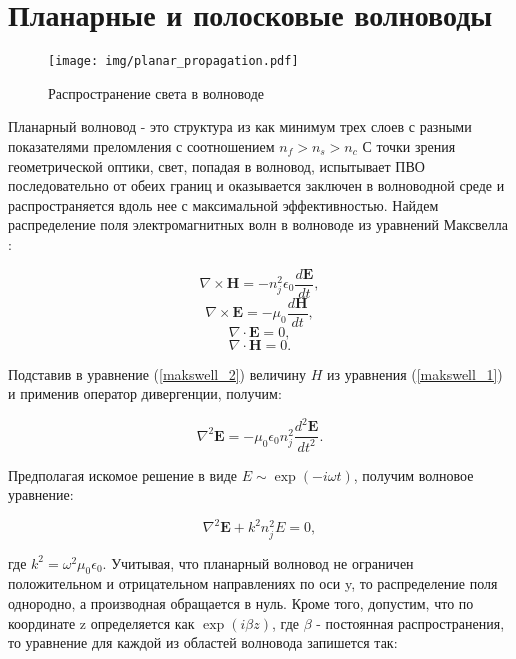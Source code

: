 \section{Планарные и полосковые волноводы}

\begin{figure}[h!]
\texttt{[image: img/planar\_propagation.pdf]}
\caption{Распространение света в волноводе}
\end{figure}

Планарный волновод - это структура из как минимум трех слоев с разными показателями преломления с соотношением $n_f > n_s > n_c$ С точки зрения геометрической оптики, свет, попадая в волновод, испытывает ПВО последовательно от обеих границ и оказывается заключен в волноводной среде и распространяется вдоль нее с максимальной эффективностью. Найдем распределение поля электромагнитных волн в волноводе из уравнений Максвелла \cite{adams}:

\begin{equation}
 	\nabla\times \mathbf{H} = -n_j^2\epsilon_0 \frac{d\mathbf{E}}{dt},
 	\label{makswell_1}
\end{equation}
\begin{equation}
	\nabla\times \mathbf{E} = -\mu_0\frac{d\mathbf{H}}{dt},
  	\label{makswell_2}
\end{equation}
\begin{equation}
 	\nabla\cdot \mathbf{E} = 0,
 	\label{makswell_3}
\end{equation}
\begin{equation}
 	\nabla\cdot \mathbf{H} = 0.
 	\label{makswell_4} 
\end{equation}

Подставив в уравнение (\ref{makswell_2}) величину $H$ из уравнения (\ref{makswell_1}) и применив оператор дивергенции, получим:

\begin{equation}
	\nabla^2\mathbf{E} = -\mu_0\epsilon_0 n_j^2 \frac{d^2\mathbf{E}}{dt^2}.
\end{equation}

Предполагая искомое решение в виде $E \sim \exp(-i\omega t)$, получим волновое уравнение:

\begin{equation}
	\nabla^2\mathbf{E} + k^2 n_j^2 E = 0,
\end{equation}

где $k^2 = \omega^2\mu_0 \epsilon_0$. Учитывая, что планарный волновод не ограничен положительном и отрицательном направлениях по оси y, то распределение поля однородно, а производная обращается в нуль. Кроме того, допустим, что по координате z определяется как $\exp(i\beta z)$, где $\beta$ - постоянная распространения, то уравнение для каждой из областей волновода запишется так:

